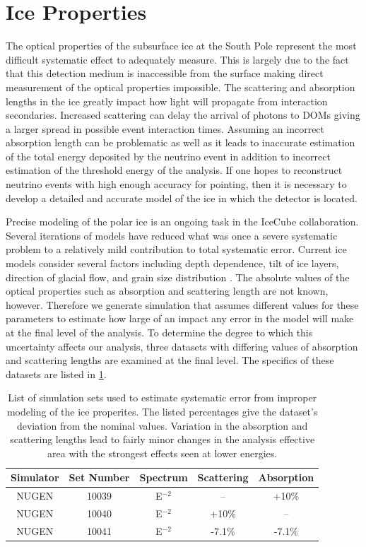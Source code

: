 \documentclass{gatech-thesis}
\begin{document}
\section{Ice Properties}
The optical properties of the subsurface ice at the South Pole represent the most difficult systematic effect to adequately measure. This is largely due to the fact that this detection medium is inaccessible from the surface making direct measurement of the optical properties impossible. The scattering and absorption lengths in the ice greatly impact how light will propagate from interaction secondaries. Increased scattering can delay the arrival of photons to DOMs giving a larger spread in possible event interaction times. Assuming an incorrect absorption length can be problematic as well as it leads to inaccurate estimation of the total energy deposited by the neutrino event in addition to incorrect estimation of the threshold energy of the analysis. If one hopes to reconstruct neutrino events with high enough accuracy for pointing, then it is necessary to develop a detailed and accurate model of the ice in which the detector is located.

Precise modeling of the polar ice is an ongoing task in the IceCube collaboration. Several iterations of models have reduced what was once a severe systematic problem to a relatively mild contribution to total systematic error. Current ice models consider several factors including depth dependence, tilt of ice layers, direction of glacial flow, and grain size distribution \cite{2013arXiv1301.5361I}. The absolute values of the optical properties such as absorption and scattering length are not known, however. Therefore we generate simulation that assumes different values for these parameters to estimate how large of an impact any error in the model will make at the final level of the analysis. To determine the degree to which this uncertainty affects our analysis, three datasets with differing values of absorption and scattering lengths are examined at the final level. The specifics of these datasets are listed in \ref{tab:ice_sets}.

\begin{table}[h]
\caption[Ice Properties Systematic Datasets]{List of simulation sets used to estimate systematic error from improper modeling of the ice properites. The listed percentages give the dataset's deviation from the nominal values. Variation in the absorption and scattering lengths lead to fairly minor changes in the analysis effective area with the strongest effects seen at lower energies.\label{tab:ice_sets}}
\begin{center}
\begin{tabular}{ccccc}
\toprule
\textbf{Simulator} & \textbf{Set Number} &\textbf{Spectrum} & \textbf{Scattering} & \textbf{Absorption}\\
\midrule
NUGEN & 10039 & E$^{-2}$ & -- & +10$\%$ \\
NUGEN & 10040 & E$^{-2}$ & +10$\%$ & -- \\
NUGEN & 10041 & E$^{-2}$ & -7.1$\%$ & -7.1$\%$ \\
\hline
\end{tabular}
\end{center}
\end{table}
\end{document}
